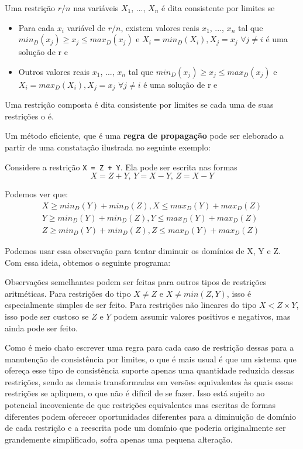 \documentclass{article}
\begin{document}
\begin{definition}
  Uma restrição $r/n$ nas variáveis $X_1$, ..., $X_n$ é dita consistente por limites
  se
  \begin{itemize}
    \item Para cada $x_i$ variável de $r/n$, existem valores reais $x_1$, ..., $x_n$ tal que $min_D(x_j) \geq x_j \leq max_D(x_j)$
          e $X_i = min_D(X_i), X_j = x_j$ $\forall j \neq i$ é uma solução de r e
    \item Outros valores reais $x_1$, ..., $x_n$ tal que $min_D(x_j) \geq x_j \leq max_D(x_j)$
          e $X_i = max_D(X_i), X_j = x_j$ $\forall j \neq i$ é uma solução de r e
  \end{itemize}
  Uma restrição composta é dita consistente por limites se cada uma de suas restrições o é.
\end{definition}

Um método eficiente, que é uma \textbf{regra de propagação} pode ser eleborado a partir
de uma constatação ilustrada no seguinte exemplo:

Considere a restrição {\tt X = Z + Y}. Ela pode ser escrita nas formas
\[
  X = Z + Y \text{, } Y = X - Y \text{, } Z = X - Y
\]

Podemos ver que:
\begin{gather}
  X \geq min_D(Y)+min_D(Z),  X \leq max_D(Y) + max_D(Z)\\
  Y \geq min_D(Y)+min_D(Z),  Y \leq max_D(Y) + max_D(Z)\\
  Z \geq min_D(Y)+min_D(Z),  Z \leq max_D(Y) + max_D(Z)
\end{gather}

Podemos usar essa observação para tentar diminuir os domínios de X, Y e Z. Com essa ideia, obtemos o seguinte programa:

\label{lst:bounds}

Observações semelhantes podem ser feitas para outros tipos de restrições aritméticas. Para restrições do tipo $X \neq Z$ e $X  \neq min(Z, Y)$, isso é especialmente simples de ser feito. Para restrições  não lineares do tipo $X < Z\times Y$, isso pode ser
custoso se $Z$ e $Y$ podem assumir valores positivos e negativos, mas ainda pode ser feito.

Como é meio chato escrever uma regra para cada caso de restrição dessas para a manutenção de consistência por limites, o que é
mais usual é que um sistema que ofereça esse tipo de consistência suporte apenas uma quantidade reduzida dessas restrições,
sendo as demais transformadas em versões equivalentes às quais essas restrições se apliquem, o que não é difícil de se fazer.
Isso está sujeito ao potencial incoveniente de que restrições equivalentes mas escritas de formas diferentes podem oferecer
oportunidades diferentes para a diminuição de domínio de cada restrição e a reescrita pode um domínio que poderia originalmente ser
grandemente simplificado, sofra apenas uma pequena alteração.
\end{document}
